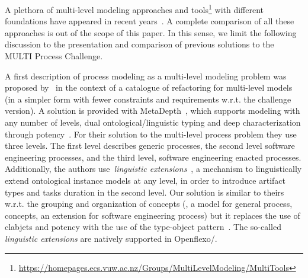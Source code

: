 



A plethora of multi-level modeling approaches and tools\footnote{\url{https://homepages.ecs.vuw.ac.nz/Groups/MultiLevelModeling/MultiTools}} with different foundations have appeared in recent years~\parencite{somogyi2021playground}. A complete comparison of all these approaches is out of the scope of this paper. In this sense, we limit the following discussion to the presentation and comparison of previous solutions to the MULTI Process Challenge.

A first description of process modeling as a multi-level modeling problem was
proposed by~\textcite{lara2018refactoring} in the context of a catalogue of
refactoring for multi-level models (in a simpler form with fewer constraints
and requirements w.r.t. the challenge version). A solution is provided with
MetaDepth~\parencite{metadepth}, which supports modeling with any number of
levels, dual ontological/linguistic typing and deep characterization through
potency~\parencite{atkinson2001essence}. For their solution to the multi-level process problem
they use three levels. The first level describes generic processes, the second
level software engineering processes, and the third level, software engineering
enacted processes. Additionally, the authors use~\emph{linguistic
extensions}~\parencite{metadepth}, a mechanism to  linguistically extend
ontological instance models at any level, in order to introduce artifact types
and tasks duration in the second level. Our solution is similar to theirs
w.r.t. the grouping and organization of concepts (\eg, a model for general process, concepts, an extension for software engineering process) but it replaces the use of clabjets and potency with the use of the type-object pattern~\parencite{typeObject}. The so-called \emph{linguistic extensions} are natively supported in Openflexo/\FML.



